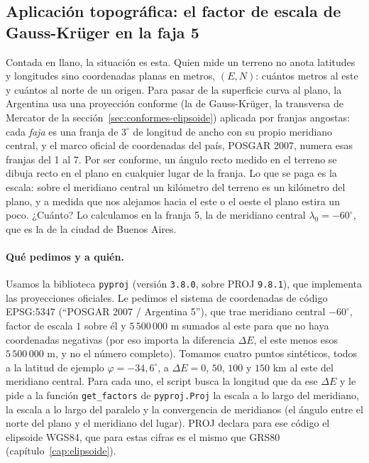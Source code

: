 
\subsection{Aplicación topográfica: el factor de escala de Gauss-Krüger en la faja 5}\label{sec:conformes-aplicacion}

Contada en llano, la situación es esta. Quien mide un terreno no anota latitudes y longitudes
sino coordenadas planas en metros, \((E,N)\): cuántos metros al este y cuántos al norte de un
origen. Para pasar de la superficie curva al plano, la Argentina usa una proyección conforme
(la de Gauss-Krüger, la transversa de Mercator de la sección~\ref{sec:conformes-elipsoide})
aplicada por franjas angostas: cada \emph{faja} es una franja de \(3^\circ\) de longitud de
ancho con su propio meridiano central, y el marco oficial de coordenadas del país, POSGAR 2007,
numera esas franjas del 1 al 7. Por ser conforme, un ángulo recto medido en el terreno se
dibuja recto en el plano en cualquier lugar de la franja. Lo que se paga es la escala: sobre
el meridiano central un kilómetro del terreno es un kilómetro del plano, y a medida que nos
alejamos hacia el este o el oeste el plano estira un poco. ¿Cuánto? Lo calculamos en la
franja 5, la de meridiano central \(\lambda_0=-60^\circ\), que es la de la ciudad de Buenos
Aires.

\paragraph{Qué pedimos y a quién.} Usamos la biblioteca \texttt{pyproj} (versión \texttt{3.8.0}, sobre
PROJ \texttt{9.8.1}), que implementa las proyecciones oficiales. Le pedimos el sistema de coordenadas
de código EPSG:5347 (\enquote{POSGAR 2007 / Argentina 5}), que trae meridiano central
\(-60^\circ\), factor de escala \(1\) sobre él y \(5\,500\,000\) m sumados al este para que no
haya coordenadas negativas (por eso importa la diferencia \(\Delta E\), el este menos esos
\(5\,500\,000\) m, y no el número completo). Tomamos cuatro puntos sintéticos, todos a la latitud
de ejemplo \(\varphi=-34{,}6^\circ\), a \(\Delta E=0\), \(50\), \(100\) y \(150\) km al este del
meridiano central. Para cada uno, el script busca la longitud que da ese \(\Delta E\) y le pide
a la función \texttt{get\_factors} de \texttt{pyproj.Proj} la escala a lo largo del meridiano,
la escala a lo largo del paralelo y la convergencia de meridianos (el ángulo entre el norte
del plano y el meridiano del lugar). PROJ declara para ese código el elipsoide WGS84, que para
estas cifras es el mismo que GRS80 (capítulo~\ref{cap:elipsoide}).

